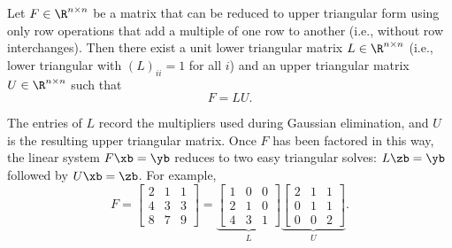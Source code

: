 \begin{definition}[LU decomposition]
    Let $F \in \R^{n \times n}$ be a matrix that can be reduced to upper triangular form using only row operations that add a multiple of one row to another (i.e., without row interchanges). Then there exist a unit lower triangular matrix $L \in \R^{n \times n}$ (i.e., lower triangular with $(L)_{ii}=1$ for all $i$) and an upper triangular matrix $U \in \R^{n \times n}$ such that
    \begin{equation*}
        F = LU.
    \end{equation*}
\end{definition}
The entries of $L$ record the multipliers used during Gaussian elimination, and $U$ is the resulting upper triangular matrix. Once $F$ has been factored in this way, the linear system $F\xb = \yb$ reduces to two easy triangular solves: $L\zb = \yb$ followed by $U\xb = \zb$. For example,
\begin{equation*}
    F = \begin{bmatrix}
        2 & 1 & 1 \\
        4 & 3 & 3 \\
        8 & 7 & 9
    \end{bmatrix}
    =
    \underbrace{\begin{bmatrix}
        1 & 0 & 0 \\
        2 & 1 & 0 \\
        4 & 3 & 1
    \end{bmatrix}}_{L}
    \underbrace{\begin{bmatrix}
        2 & 1 & 1 \\
        0 & 1 & 1 \\
        0 & 0 & 2
    \end{bmatrix}}_{U}.
\end{equation*}

